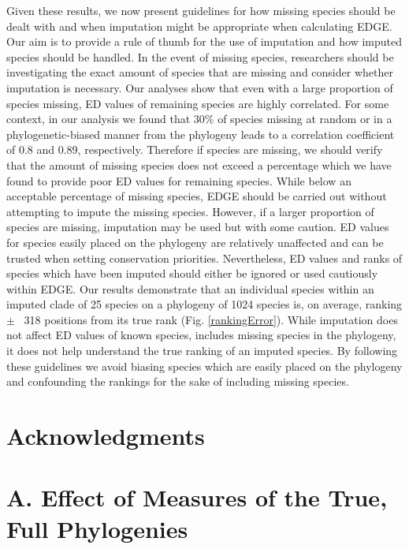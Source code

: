 \documentclass[12pt,english]{article}
\begin{document}
Given these results, we now present guidelines for how missing species should be
dealt with and when imputation might be appropriate when calculating EDGE. Our
aim is to provide a rule of thumb for the use of imputation and how imputed
species should be handled. In the event of missing species, researchers should
be investigating the exact amount of species that are missing and consider
whether imputation is necessary. Our analyses show that even with a large
proportion of species missing, ED values of remaining species are highly
correlated. For some context, in our analysis we found that 30\% of species
missing at random or in a phylogenetic-biased manner from the phylogeny leads to
a correlation coefficient of 0.8 and 0.89, respectively. Therefore if species
are missing, we should verify that the amount of missing species does not exceed
a percentage which we have found to provide poor ED values for remaining
species. While below an acceptable percentage of missing species, EDGE should be
carried out without attempting to impute the missing species. However, if a
larger proportion of species are missing, imputation may be used but with some
caution. ED values for species easily placed on the phylogeny are relatively
unaffected and can be trusted when setting conservation priorities.
Nevertheless, ED values and ranks of species which have been imputed should
either be ignored or used cautiously within EDGE. Our results demonstrate that
an individual species within an imputed clade of 25 species on a phylogeny of
1024 species is, on average, ranking $\pm$ ~318 positions from its true rank (Fig. 
\ref{rankingError}).
While imputation does not affect ED values of known species, includes missing
species in the phylogeny, it does not help understand the true ranking of an
imputed species. By following these guidelines we avoid biasing species which
are easily placed on the phylogeny and confounding the rankings for the sake of
including missing species.

\section*{Acknowledgments}

\clearpage
\printbibliography

\clearpage
\appendix
\section*{A. Effect of Measures of the True, Full Phylogenies}
\end{document}
